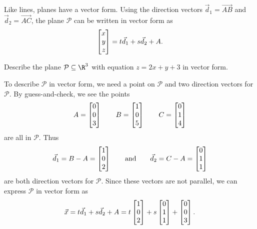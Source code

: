 Like lines, planes have a vector form.  Using the direction vectors $\vec d_1=\overrightarrow{AB}$ and 
$\vec d_2=\overrightarrow{AC}$,
the plane $\mathcal P$ can be written in vector form as
\[
	\mat{x\\y\\z} = t\vec d_1+s\vec d_2+A.
\]
\begin{center}
\end{center}


\begin{example}
	Describe the plane $\mathcal P\subseteq \R^3$ with equation $z=2x+y+3$ in vector form.

	To describe $\mathcal P$ in vector form, we need a point on $\mathcal P$ and two direction
	vectors for $\mathcal P$. By guess-and-check, we see the points
	\[
		A=\mat{0\\0\\3}\qquad B=\mat{1\\0\\5}\qquad C=\mat{0\\1\\4}
	\]
	are all in $\mathcal P$. Thus
	\[
		\vec d_1=B-A=\mat{1\\0\\2}\qquad \text{and}\qquad
		\vec d_2=C-A=\mat{0\\1\\1}
	\]
	are both direction vectors for $\mathcal P$.  Since these vectors are not parallel, 
	we can express $\mathcal P$ in vector
	form as
	\[
		\vec x=t\vec d_1+s\vec d_2+A=t\mat{1\\0\\2}+s\mat{0\\1\\1}+\mat{0\\0\\3}.
	\]
\end{example}


